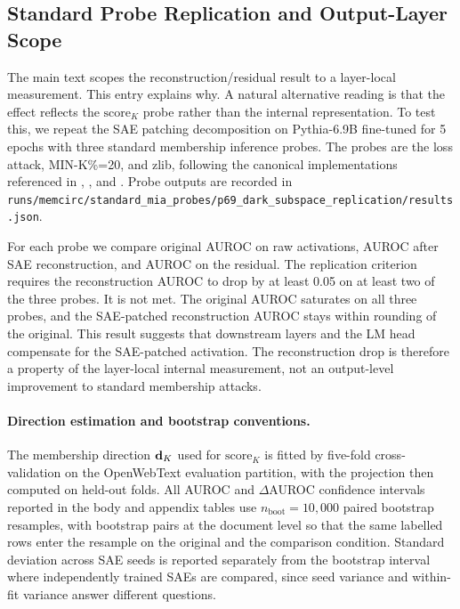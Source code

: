 \subsection{Standard Probe Replication and Output-Layer Scope}
\label{app:standard_probes}

The main text scopes the reconstruction/residual result to a layer-local measurement. This entry explains why. A natural alternative reading is that the effect reflects the $\mathrm{score}_K$ probe rather than the internal representation. To test this, we repeat the SAE patching decomposition on Pythia-6.9B fine-tuned for 5 epochs with three standard membership inference probes. The probes are the loss attack, MIN-K\%=20, and zlib, following the canonical implementations referenced in \citet{yeom2018privacy}, \citet{shi2023detecting}, and \citet{carlini2021extracting}. Probe outputs are recorded in \texttt{runs/\allowbreak{}memcirc/\allowbreak{}standard\_\allowbreak{}mia\_\allowbreak{}probes/\allowbreak{}p69\_\allowbreak{}dark\_\allowbreak{}subspace\_\allowbreak{}replication/\allowbreak{}results.json}.

For each probe we compare original AUROC on raw activations, AUROC after SAE reconstruction, and AUROC on the residual. The replication criterion requires the reconstruction AUROC to drop by at least 0.05 on at least two of the three probes. It is not met. The original AUROC saturates on all three probes, and the SAE-patched reconstruction AUROC stays within rounding of the original. This result suggests that downstream layers and the LM head compensate for the SAE-patched activation. The reconstruction drop is therefore a property of the layer-local internal measurement, not an output-level improvement to standard membership attacks.

\paragraph{Direction estimation and bootstrap conventions.}
The membership direction $\mathbf{d}_K$ used for $\mathrm{score}_K$ is fitted by five-fold cross-validation on the OpenWebText evaluation partition, with the projection then computed on held-out folds. All AUROC and $\Delta$AUROC confidence intervals reported in the body and appendix tables use $n_{\mathrm{boot}} = 10{,}000$ paired bootstrap resamples, with bootstrap pairs at the document level so that the same labelled rows enter the resample on the original and the comparison condition. Standard deviation across SAE seeds is reported separately from the bootstrap interval where independently trained SAEs are compared, since seed variance and within-fit variance answer different questions.

